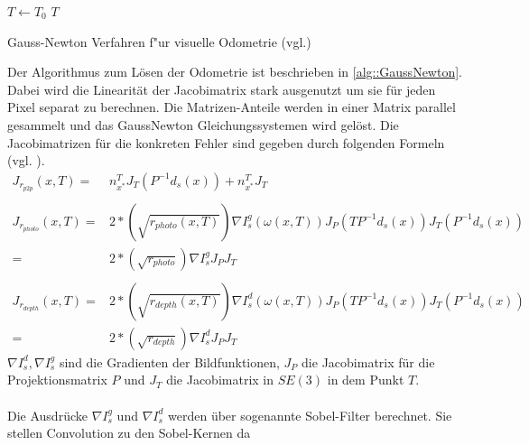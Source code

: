 \documentclass[12pt,DIV=15,BCOR=15mm,twoside,headsepline,abstract=true,listof=totoc,bibliography=totoc]{scrreprt}
\theoremstyle{remark}    %
\begin{document}
    \begin{algorithm}[t]
        \SetAlgoLined
        $T \gets T_0$\;
        \Return $T$\;
        \caption{Gauss-Newton Verfahren f"ur  visuelle Odometrie (vgl.\cite[Kap.8.4]{Absil2008}\cite{Zhou2018,Park_2017_ICCV})}\label{alg::GaussNewton}
    \end{algorithm} \noindent
    Der Algorithmus zum Lösen der Odometrie ist beschrieben in \ref{alg::GaussNewton}. Dabei wird die Linearität der Jacobimatrix stark ausgenutzt um sie für 
    jeden Pixel separat zu berechnen. Die Matrizen-Anteile werden in einer Matrix parallel gesammelt und das GaussNewton Gleichungssystemen wird gelöst.
    Die Jacobimatrizen für die konkreten Fehler sind gegeben durch folgenden Formeln (vgl. \cite[S.146, Fom.28-30]{Park_2017_ICCV}). 
    \begin{align*}
        \label{jacobian}
        J_{r_{p2p}}(x,T)=&n_{x^*}^{T}J_T(P^{-1}d_s(x))+ n_{x^*}^{T}J_T \\\\
        J_{r_{photo}}(x,T)=&2*\left(\sqrt{r_{photo}(x,T)}\right)\nabla I_s^g(\omega(x,T)) J_P(TP^{-1}d_s(x)) J_T(P^{-1}d_s(x))\\
                         =&2*\left(\sqrt{r_{photo}}\right)\nabla I_s^g J_P J_T\\\\
        J_{r_{depth}}(x,T)=&2*\left(\sqrt{r_{depth}(x,T)}\right)\nabla I_s^d(\omega(x,T)) J_P(TP^{-1}d_s(x)) J_T(P^{-1}d_s(x))\\
                        =&2*\left(\sqrt{r_{depth}}\right)\nabla I_s^dJ_PJ_T
    \end{align*}
    $\nabla I_s^d,\nabla I_s^g$ sind die Gradienten der Bildfunktionen, $J_P$ die Jacobimatrix für die Projektionsmatrix $P$ und $J_T$ die Jacobimatrix 
    in $SE(3)$ in dem Punkt $T$.\\\\
    Die Ausdrücke  $\nabla I_s^g$ und $\nabla I_s^d$ werden über sogenannte Sobel-Filter berechnet. Sie stellen Convolution zu den Sobel-Kernen da
\end{document}
